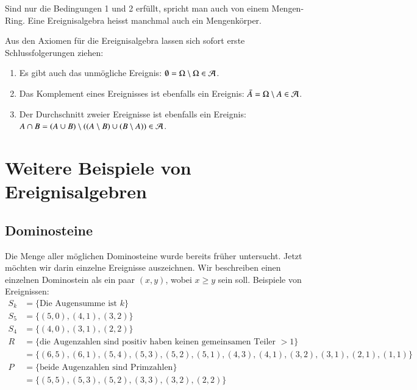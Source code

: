 Sind nur die Bedingungen 1 und 2 erfüllt, spricht man auch von einem
Mengen-Ring.
Eine Ereignisalgebra heisst manchmal auch ein Mengenkörper.

Aus den Axiomen für die Ereignisalgebra lassen sich sofort erste
Schlussfolgerungen ziehen:
\begin{enumerate}
\item Es gibt auch das unmögliche Ereignis: $\emptyset = \Omega\setminus\Omega\in{\cal A}$.
\item Das Komplement eines Ereignisses ist ebenfalls ein Ereignis: $\bar A=\Omega\setminus A\in{\cal A}$.
\item Der Durchschnitt zweier Ereignisse ist ebenfalls ein Ereignis: $A\cap B = 
(A\cup B) \setminus ((A\setminus B) \cup (B\setminus A))\in{\cal A}$.
\end{enumerate}

\section{Weitere Beispiele von Ereignisalgebren} \label{section-beispiele}
\subsection{Dominosteine}
Die Menge aller möglichen Dominosteine wurde bereits früher untersucht.
Jetzt möchten wir darin einzelne Ereignisse auszeichnen.
Wir beschreiben
einen einzelnen Dominostein als ein paar $(x,y)$, wobei $x\ge y$ sein soll.
Beispiele von Ereignissen:
\begin{align*}
S_k&=\{ \text{Die Augensumme ist $k$}\}\\
S_5&=\{ (5,0), (4,1), (3,2) \}\\
S_4&=\{ (4,0), (3,1), (2,2) \}\\
R&=\{\text{die Augenzahlen sind positiv haben keinen gemeinsamen Teiler $>1$}\}\\
 &=\{ (6,5), (6,1), (5,4), (5,3), (5,2), (5,1), (4,3), (4,1), (3,2), (3,1), (2,1), (1,1) \}
\\
P&=\{\text{beide Augenzahlen sind Primzahlen}\}\\
 &=\{(5,5), (5,3), (5,2), (3,3), (3,2), (2,2) \}\\
\end{align*}

